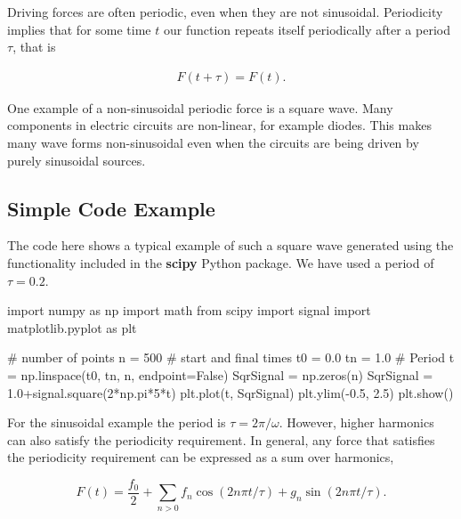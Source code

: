 \documentclass[%
oneside,                 %
final,                   %
10pt]{article}
\begin{document}
Driving forces are often periodic, even when they are not
sinusoidal. Periodicity implies that for some time $t$ our function repeats itself periodically after a period $\tau$, that is

\begin{eqnarray}
F(t+\tau)=F(t). 
\end{eqnarray}

One example of a non-sinusoidal periodic force is a square wave. Many
components in electric circuits are non-linear, for example diodes. This 
makes many wave forms non-sinusoidal even when the circuits are being
driven by purely sinusoidal sources.

\subsection{Simple Code Example}

The code here shows a typical example of such a square wave generated
using the functionality included in the \textbf{scipy} Python package. We
have used a period of $\tau=0.2$.



















\bpycod
import numpy as np
import math
from scipy import signal
import matplotlib.pyplot as plt

# number of points                                                                                       
n = 500
# start and final times                                                                                  
t0 = 0.0
tn = 1.0
# Period                                                                                                 
t = np.linspace(t0, tn, n, endpoint=False)
SqrSignal = np.zeros(n)
SqrSignal = 1.0+signal.square(2*np.pi*5*t)
plt.plot(t, SqrSignal)
plt.ylim(-0.5, 2.5)
plt.show()

\epycod


For the sinusoidal example the
period is $\tau=2\pi/\omega$. However, higher harmonics can also
satisfy the periodicity requirement. In general, any force that
satisfies the periodicity requirement can be expressed as a sum over
harmonics,

\begin{equation}
F(t)=\frac{f_0}{2}+\sum_{n>0} f_n\cos(2n\pi t/\tau)+g_n\sin(2n\pi t/\tau).
\end{equation}
\end{document}
